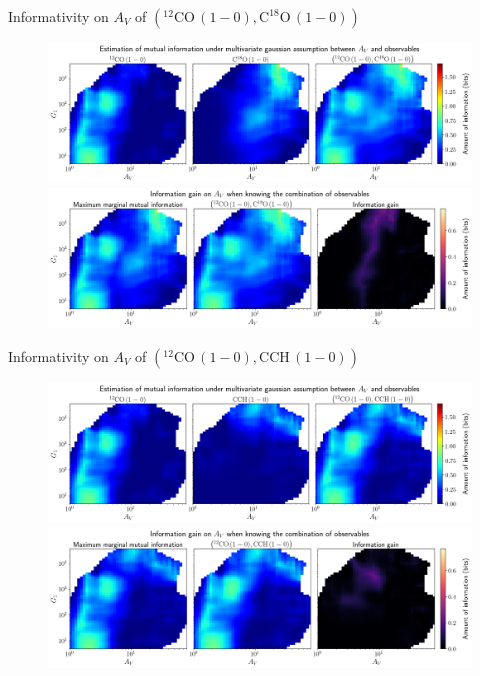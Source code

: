 \documentclass{beamer}
\begin{document}
\begin{frame}{Informativity on $A_V$ of $\left(\mathrm{^{12}CO\,(1-0)},\mathrm{C^{18}O\,(1-0)}\right)$}
    \begin{figure}
        \centering
        \includegraphics[width=0.95\linewidth]{../linearinfogauss/av__12co10_c18o10_linearinfogauss.png}
        \vfill
        \includegraphics[width=0.95\linewidth]{../linearinfogauss/av__12co10_c18o10_linearinfogauss_gain.png}
    \end{figure}
\end{frame}

\begin{frame}{Informativity on $A_V$ of $\left(\mathrm{^{12}CO\,(1-0)},\mathrm{CCH\,(1-0)}\right)$}
    \begin{figure}
        \centering
        \includegraphics[width=0.95\linewidth]{../linearinfogauss/av__12co10_cch10_linearinfogauss.png}
        \vfill
        \includegraphics[width=0.95\linewidth]{../linearinfogauss/av__12co10_cch10_linearinfogauss_gain.png}
    \end{figure}
\end{frame}
\end{document}
